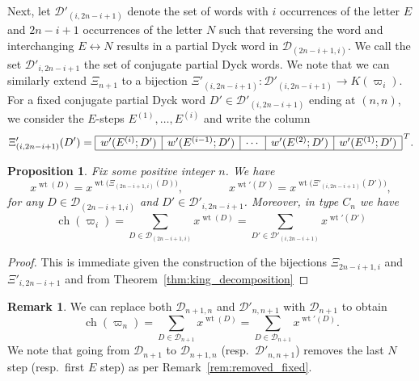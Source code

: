 \documentclass[11pt, leqno]{amsart}
\theoremstyle{plain}
\newtheorem{proposition}[theorem]{Proposition}
\theoremstyle{definition}
\newtheorem{remark}[theorem]{Remark}
\numberwithin{equation}{section}
\newcommand{\fw}{\varpi} %
\newcommand{\Dyck}{\mathcal{D}} %
\newcommand{\wt}{\operatorname{wt}} %
\newcommand{\ch}{\operatorname{ch}} %
\begin{document}
Next, let $\Dyck'_{(i,2n-i+1)}$ denote the set of words with $i$ occurrences of the letter $E$ and $2n-i+1$ occurrences of the letter $N$ such that reversing the word and interchanging $E \longleftrightarrow N$ results in a partial Dyck word in $\Dyck_{(2n-i+1,i)}$.
We call the set $\Dyck'_{i,2n-i+1}$ the set of conjugate partial Dyck words.
We note that we can similarly extend $\Xi_{n+1}$ to a bijection $\Xi'_{(i,2n-i+1)} \colon \Dyck'_{(i,2n-i+1)} \to K(\fw_i)$.
For a fixed conjugate partial Dyck word $D' \in \Dyck'_{(i,2n-i+1)}$ ending at $(n,n)$, we consider the $E$-steps $E^{(1)}, \dotsc, E^{(i)}$ and write the column
\[
\Xi'_{(i,2n-i+1)}(D') = \begin{array}{|c|c|c|c|c|}
\hline
w'(E^{(i)};D') & w'(E^{(i-1)};D') & \cdots & w'(E^{(2)};D') & w'(E^{(1)};D')
\\\hline
\end{array}^{\,T}.
\]

\begin{proposition}
\label{prop:fundamental_char}
Fix some positive integer $n$. We have
\[
x^{\wt(D)} = x^{\wt\bigl( \Xi_{(2n-i+1,i)}(D) \bigr)},
\qquad\qquad
x^{\wt'(D')} = x^{\wt\bigl( \Xi'_{(i,2n-i+1)}(D') \bigr)},
\]
for any $D \in \Dyck_{(2n-i+1,i)}$ and $D' \in \Dyck'_{i,2n-i+1}$.
Moreover, in type $C_n$ we have
\[
\ch(\fw_i) = \sum_{D \in \Dyck_{(2n-i+1,i)}} x^{\wt(D)} = \sum_{D' \in \Dyck'_{(i,2n-i+1)}} x^{\wt'(D')}
\]
\end{proposition}

\begin{proof}
This is immediate given the construction of the bijections $\Xi_{2n-i+1,i}$ and $\Xi'_{i,2n-i+1}$ and from Theorem~\ref{thm:king_decomposition}
\end{proof}

\begin{remark}
\label{rem:catalan_extension}
We can replace both $\Dyck_{n+1,n}$ and $\Dyck'_{n,n+1}$ with $\Dyck_{n+1}$ to obtain
\[
\ch(\fw_n) = \sum_{D \in \Dyck_{n+1}} x^{\wt(D)} = \sum_{D \in \Dyck_{n+1}} x^{\wt'(D)}.
\]
We note that going from $\Dyck_{n+1}$ to $\Dyck_{n+1,n}$ (resp.~$\Dyck'_{n,n+1}$) removes the last $N$ step (resp.\ first $E$ step) as per Remark~\ref{rem:removed_fixed}.
\end{remark}
\end{document}
